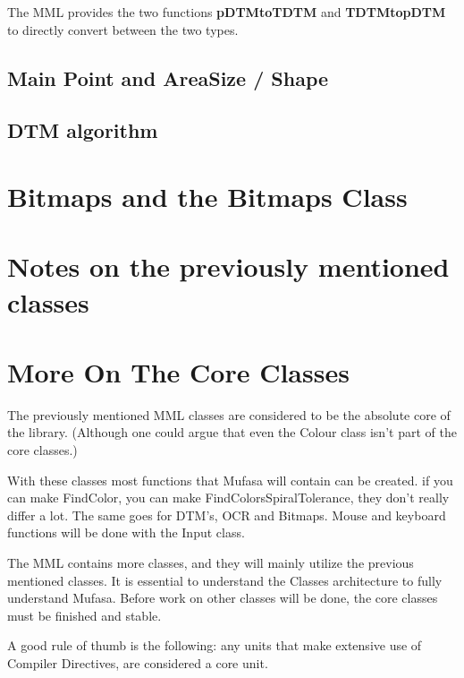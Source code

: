 \documentclass[a4paper, 10pt]{report} %
\begin{document}
The MML provides the two functions \textbf{pDTMtoTDTM} and \textbf{TDTMtopDTM} to
directly convert between the two types.

\subsection{Main Point and AreaSize / Shape}

\subsection{DTM algorithm}

\section{Bitmaps and the Bitmaps Class}



\section{Notes on the previously mentioned classes}


\section{More On The Core Classes}

The previously mentioned MML classes are considered to be the absolute core of the library. (Although one could argue that even the Colour class isn't part of the core classes.)

With these classes most functions that Mufasa will contain can be created. if you can make FindColor, you can make FindColorsSpiralTolerance, they don't really differ a lot. The same goes for DTM's, OCR and Bitmaps. Mouse and keyboard functions will be done with the Input class.

The MML contains more classes, and they will mainly utilize the previous mentioned classes.
It is essential to understand the Classes architecture to fully understand Mufasa.
Before work on other classes will be done, the core classes must be finished and stable.

A good rule of thumb is the following: any units that make extensive use of Compiler Directives, are considered a core unit.
\end{document}
